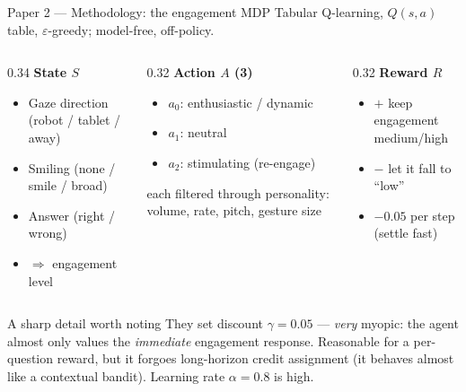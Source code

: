 \documentclass[aspectratio=169,10pt]{beamer}
\begin{document}
\begin{frame}{Paper 2 --- Methodology: the engagement MDP}
  \footnotesize Tabular Q-learning, $Q(s,a)$ table, $\varepsilon$-greedy; model-free, off-policy.
  \vspace{0.3em}
  \begin{columns}[T]
    \begin{column}{0.34\textwidth}
      \textbf{State $S$}
      \begin{itemize}\footnotesize
        \item Gaze direction (robot / tablet / away)
        \item Smiling (none / smile / broad)
        \item Answer (right / wrong)
        \item $\Rightarrow$ engagement level
      \end{itemize}
    \end{column}
    \begin{column}{0.32\textwidth}
      \textbf{Action $A$ (3)}
      \begin{itemize}\footnotesize
        \item $a_0$: enthusiastic / dynamic
        \item $a_1$: neutral
        \item $a_2$: stimulating (re-engage)
      \end{itemize}
      {\scriptsize each filtered through personality: volume, rate, pitch, gesture size}
    \end{column}
    \begin{column}{0.32\textwidth}
      \textbf{Reward $R$}
      \begin{itemize}\footnotesize
        \item $+$ keep engagement medium/high
        \item $-$ let it fall to ``low''
        \item $-0.05$ per step (settle fast)
      \end{itemize}
    \end{column}
  \end{columns}
  \vspace{0.3em}
  \begin{alertblock}{A sharp detail worth noting}
    \footnotesize They set discount $\gamma=0.05$ --- \emph{very} myopic: the agent almost only values the \emph{immediate} engagement response. Reasonable for a per-question reward, but it forgoes long-horizon credit assignment (it behaves almost like a contextual bandit). Learning rate $\alpha=0.8$ is high.
  \end{alertblock}
\end{frame}
\end{document}
